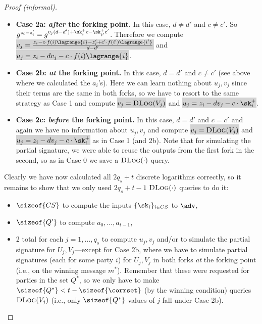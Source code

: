 \begin{proof}[Proof (informal)]
\begin{itemize}
    \item \textbf{Case 2a: \emph{after} the forking point.} In this case, $d \neq d'$ and $c \neq c'$. So $g^{z_i - z_i'} = g^{v_j(d-d') + \sk_i^+ c - \sk_{i'}^+ c'}$. Therefore we compute \colorbox{lightgray}{$v_j = \frac{z_i - c \cdot f(i) \lagrange{i} - z_i' + c' \cdot f(i') \lagrange{i'}}{d-d'}$} and \colorbox{lightgray}{$u_j = z_i - d v_j - c \cdot f(i) \lagrange{i}$}.
    \item \textbf{Case 2b: \emph{at} the forking point.} In this case, $d = d'$ and $c \neq c'$ (see above where we calculated the $a_i$'s). Here we can learn nothing about $u_j, v_j$ since their terms are the same in both forks, so we have to resort to the same strategy as Case 1 and compute \colorbox{lightgray}{$v_j = \textsc{DLog}(V_j)$} and \colorbox{lightgray}{$u_j = z_i - dv_j - c \cdot \sk_i^+$}.
    \item \textbf{Case 2c: \emph{before} the forking point.} In this case, $d = d'$ and $c=c'$ and again we have no information about $u_j, v_j$ and compute \colorbox{lightgray}{$v_j = \textsc{DLog}(V_j)$} and \colorbox{lightgray}{$u_j = z_i - dv_j - c \cdot \sk_i^+$} as in Case 1 (and 2b). Note that for simulating the partial signature, we were able to reuse the outputs from the first fork in the second, so as in Case 0 we save a $\textsc{DLog}(\cdot)$ query.
\end{itemize}

Clearly we have now calculated all $2q_s + t$ discrete logarithms correctly, so it remains to show that we only used $2q_s + t - 1$ $\textsc{DLog}(\cdot)$ queries to do it:

\begin{itemize}
    \item $\sizeof{CS}$ to compute the inputs $\{\sk_i\}_{i \in CS}$ to $\adv$,
    \item $\sizeof{Q'}$ to compute $a_0, \dots, a_{t-1}$,
    \item 2 total for each $j=1, \dots, q_s$ to compute $u_j, v_j$ and/or to simulate the partial signature for $U_j, V_j$---except for Case 2b, where we have to simulate partial signatures (each for some party $i$) for $U_j, V_j$ in both forks \emph{at} the forking point (i.e., on the winning message $m^*$). Remember that these were requested for parties in the set $Q^*$, so we only have to make $\sizeof{Q^*} < t - \sizeof{\corrset}$ (by the winning condition) queries $\textsc{DLog}(V_j)$ (i.e., only $\sizeof{Q^*}$ values of $j$ fall under Case 2b).
\end{itemize}


\end{proof}
